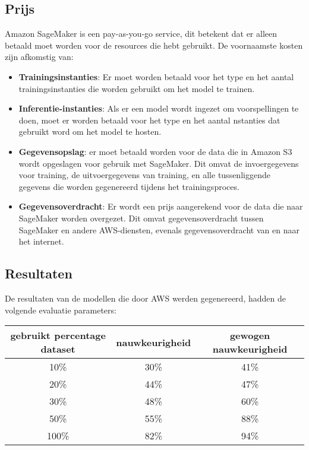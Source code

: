 \subsection{Prijs}
Amazon SageMaker is een pay-as-you-go service, dit betekent dat er alleen betaald moet worden voor de resources die hebt gebruikt. De voornaamste kosten zijn afkomstig van:
\begin{itemize}
    \item \textbf{Trainingsinstanties}: Er moet worden betaald voor het type en het aantal trainingsinstanties die worden gebruikt om het model te trainen.
    
    \item \textbf{ Inferentie-instanties}: Als er een model wordt ingezet om voorspellingen te doen, moet er worden betaald voor het type en het aantal nstanties dat gebruikt word om het model te hosten.
    
    \item \textbf{Gegevensopslag}: er moet betaald worden voor de data die in Amazon S3 wordt opgeslagen voor gebruik met SageMaker. Dit omvat de invoergegevens voor training, de uitvoergegevens van training, en alle tussenliggende gegevens die worden gegenereerd tijdens het trainingsproces.
    
    \item\textbf{ Gegevensoverdracht}: Er wordt een prijs aangerekend voor de data die naar SageMaker worden overgezet. Dit omvat gegevensoverdracht tussen SageMaker en andere AWS-diensten, evenals gegevensoverdracht van en naar het internet.
\end{itemize}

\subsection{Resultaten}
De resultaten van de modellen die door AWS werden gegenereerd, hadden de volgende evaluatie parameters:
\begin{center}
    \begin{tabular} {|c | c | c |}
        \hline
        gebruikt percentage dataset & nauwkeurigheid & gewogen nauwkeurigheid \\
        \hline
        10\% & 30\% & 41\% \\
        \hline
        20\% & 44\% & 47\% \\
        \hline
         30\% & 48\% & 60\% \\
        \hline
         50\% & 55\% & 88\% \\
        \hline
         100\% & 82\% & 94\% \\
        \hline
    \end{tabular}
\end{center}


